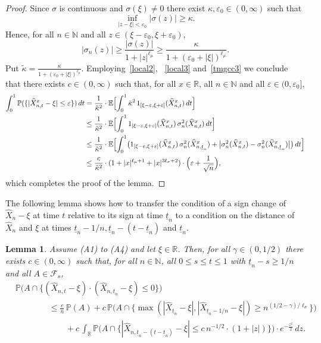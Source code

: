 \documentclass[11pt]{amsart}
\newcommand{\R}{{\mathbb R}}
\newcommand{\N}{{\mathbb N}}
\newcommand{\EE}{{\mathbb E}}
\newcommand{\PP}{{\mathbb P}}
\newcommand{\eul}{{\widehat X}}
\newcommand{\utn}{\underline {t}_n}
\newcommand{\eps}{\varepsilon}
\newcommand{\F}{{\mathcal F}}
\theoremstyle{plain}
\newtheorem{lemma}{Lemma}
\theoremstyle{definition}
\begin{document}
\begin{proof}
Since $\sigma$ is continuous and $\sigma(\xi)\neq 0$ there exist  $\kappa,\eps_0\in(0,\infty)$ such that
\[
\inf_{|z-\xi|< \eps_0}|\sigma(z)| \ge \kappa.
\]
Hence, for all $n\in\N$ and all $z\in (\xi-\eps_0,\xi+\eps_0)$,
\begin{equation}\label{tmgcc3}
|\sigma_n(z)| \ge \frac{|\sigma(z)|}{1 + |z|^{\ell_\mu}} \ge \frac{\kappa}{1 + (\eps_0 + |\xi|)^{\ell_\mu}}.
\end{equation}
Put $\tilde \kappa = \frac{\kappa}{1 + (\eps_0 + |\xi|)^{\ell_\mu}}$. Employing~\eqref{local2}, ~\eqref{local3} and~\eqref{tmgcc3} we conclude that there exists $c\in (0,\infty)$ such that, for all $x\in\R$, all $n\in\N$ and all $\eps \in (0,\eps_0]$,
\begin{align*}
 \int_0^1  \PP(\{|\eul_{n,t}^x-\xi|\leq \varepsilon\})\,dt  &  = \frac{1}{\tilde \kappa^2}\cdot \EE\Bigl[\int_0^1\tilde \kappa^2\, 1_{[\xi-\eps,\xi+\eps]}(\eul^x_{n,t})\, dt\Bigr] \\ &  \le \frac{1}{\tilde \kappa^2}\cdot \EE\Bigl[\int_0^1 1_{[\xi-\eps,\xi+\eps]}(\eul^x_{n,t})\,  \sigma_n^2(\eul^x_{n,t})\, dt\Bigr] \\
& \le  \frac{1}{\tilde \kappa^2}\cdot \EE\Bigl[\int_0^1\bigl( 1_{[\xi-\eps,\xi+\eps]}(\eul^x_{n,t})\,  \sigma_n^2(\eul^x_{n,\utn}) + \bigl|\sigma_n^2(\eul^x_{n,t})-\sigma_n^2(\eul^x_{n,\utn})\bigr|\bigr)\, dt\Bigr]\\
&  \le  \frac{c}{\tilde \kappa^2}\cdot (1+|x|^{\ell_\mu+1}+|x|^{3\ell_\sigma+2})\cdot \Bigl( \eps + \frac{1}{\sqrt n}\Bigr),
\end{align*}
which completes the proof of the lemma.
\end{proof}

The following lemma shows how to  transfer  the condition of a sign change of $\eul_n -\xi$ at time $t$ relative to its sign at time $\utn$ to a condition on the distance of $\eul_n$ and $\xi$ at  times $\utn-1/n, \utn-(t-\utn)$ and $\utn$.


\begin{lemma}\label{central} Assume (A1) to (A4) and
let $\xi\in\R$. Then, for all $\gamma \in (0,1/2)$ there exists $c\in(0, \infty)$ such that, for all $n\in\N$, all $0\le s\le t \le 1$ with $\utn-s \ge 1/n$ and all $A\in \F_s$,
\begin{equation}\label{central1}
\begin{aligned}
& \PP\bigl(A \cap \{(\widehat X_{n,t}-\xi)\cdot( \widehat X_{n,\utn}-\xi)\le 0\}\bigr)\\
& \qquad\qquad \le \frac{c}{n}\, \PP(A) +c\,\PP\bigl(A\cap\{\max(|\widehat X_{\utn}-\xi|,|\widehat X_{\utn-1/n}-\xi|)\geq  n^{(1/2-\gamma)/\ell_\sigma}\}\bigr) \\
& \qquad\qquad\qquad + c\, \int_{\R} \PP\bigl(A \cap \bigl\{|\widehat X_{n, \utn-(t-\utn)}-\xi| \le c\,n^{-1/2} \cdot(1+|z|)\bigr\}\bigr)\cdot e^{-\frac{z^2}{2}}\, dz.
\end{aligned}
\end{equation}
\end{lemma}
\end{document}
